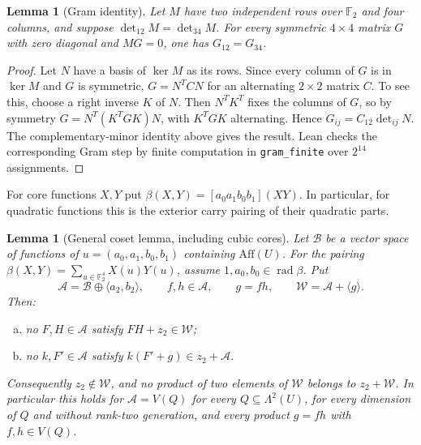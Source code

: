 \documentclass[11pt,a4paper]{article}
\theoremstyle{plain}
\newtheorem{lemma}[theorem]{Lemma}
\theoremstyle{remark}
\theoremstyle{plain}
\newcommand{\F}{\mathbb F_2}
\newcommand{\Aff}{\mathrm{Aff}}
\newcommand{\rad}{\operatorname{rad}}
\begin{document}
\begin{lemma}[Gram identity]\label{toolkit:gram}
Let $M$ have two independent rows over $\F$ and four columns, and suppose $\det_{12}M=\det_{34}M$. For every symmetric $4\times4$ matrix $G$ with zero diagonal and $MG=0$, one has $G_{12}=G_{34}$.
\end{lemma}
\begin{proof}
Let $N$ have a basis of $\ker M$ as its rows. Since every column of $G$ is in $\ker M$ and $G$ is symmetric, $G=N^T C N$ for an alternating $2\times2$ matrix $C$. To see this, choose a right inverse $K$ of $N$. Then $N^TK^T$ fixes the columns of $G$, so by symmetry $G=N^T(K^TGK)N$, with $K^TGK$ alternating. Hence $G_{ij}=C_{12}\det_{ij}N$. The complementary-minor identity above gives the result. Lean checks the corresponding Gram step by finite computation in \nolinkurl{gram_finite} over $2^{14}$ assignments.
\end{proof}

For core functions $X,Y$ put $\beta(X,Y)=[a_0a_1b_0b_1](XY)$. In particular, for quadratic functions this is the exterior carry pairing of their quadratic parts.

\begin{lemma}[General coset lemma, including cubic cores]\label{toolkit:coset}
Let $\mathcal B$ be a vector space of functions of $u=(a_0,a_1,b_0,b_1)$ containing $\Aff(U)$. For the pairing $\beta(X,Y)=\sum_{u\in\F^4}X(u)Y(u)$, assume $1,a_0,b_0\in\rad\beta$. Put
\[
\mathcal A=\mathcal B\oplus\langle a_2,b_2\rangle,\qquad f,h\in\mathcal A,\qquad g=fh,\qquad\mathcal W=\mathcal A+\langle g\rangle.
\]
Then:
\begin{enumerate}[(a)]
\item no $F,H\in\mathcal A$ satisfy $FH+z_2\in\mathcal W$;
\item no $k,F'\in\mathcal A$ satisfy $k(F'+g)\in z_2+\mathcal A$.
\end{enumerate}
Consequently $z_2\notin\mathcal W$, and no product of two elements of $\mathcal W$ belongs to $z_2+\mathcal W$.
In particular this holds for $\mathcal A=V(Q)$ for every $Q\subseteq\Lambda^2(U)$, for every dimension of $Q$ and without rank-two generation, and every product $g=fh$ with $f,h\in V(Q)$.
\end{lemma}
\end{document}

